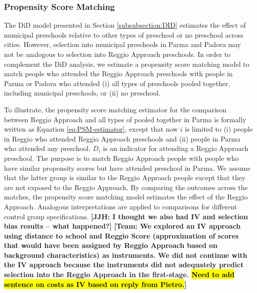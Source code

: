 \subsubsection{Propensity Score Matching}

The DiD model presented in Section \ref{subsubsection:DID} estimates the effect of municipal preschools relative to other types of preschool or no preschool across cities. However, selection into municipal preschools in Parma and Padova may not be analogous to selection into Reggio Approach preschools. In order to complement the DiD analysis, we estimate a propensity score matching model to match people who attended the Reggio Approach preschools with people in Parma or Padova who attended (i) all types of preschools pooled together, including municipal preschools, or (ii) no preschool.

To illustrate, the propensity score matching estimator for the comparison between Reggio Approach and all types of pooled together in Parma is formally written as Equation \ref{eq:PSM-estimator}, except that now $i$ is limited to (i) people in Reggio who attended Reggio Approach preschools and (ii) people in Parma who attended any preschool. $D_i$ is an indicator for attending a Reggio Approach preschool. The purpose is to match Reggio Approach people with people who have similar propensity scores but have attended preschool in Parma. We assume that the latter group is similar to the Reggio Approach people except that they are not exposed to the Reggio Approach. By comparing the outcomes across the matches, the propensity score matching model estimates the effect of the Reggio Approach. Analogous interpretations are applied to comparisons for different control group specifications. \textbf{[JJH: I thought we also had IV and selection bias results -- what happened?]} \textbf{[Team: We explored an IV approach using distance to school and Reggio Score (approximation of scores that would have been assigned by Reggio Approach based on background characteristics) as instruments. We did not continue with the IV approach because the instruments did not adequately predict selection into the Reggio Approach in the first-stage. \hl{Need to add sentence on costs as IV based on reply from Pietro.}]} 